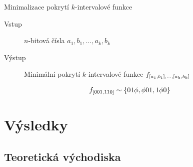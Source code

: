 \documentclass{beamer}
\theoremstyle{remark}
\begin{document}
\begin{frame}{Minimalizace pokrytí $k$-intervalové funkce}

\begin{problem} %
\begin{description}
\item[Vstup]
$n$-bitová čísla
$a_1, b_1, \ldots, a_k, b_k$

\item[Výstup]
Minimální pokrytí $k$-intervalové funkce $f_{[a_1, b_1], \ldots, [a_k, b_k]}$
\end{description}
\end{problem}

\begin{example}
$$
f_{[001, 110]} \sim \{01 \phi, \phi 01, 1 \phi 0\}
$$

\begin{figure}[h]
\centering

\end{figure}
\end{example}
\end{frame}

\section{Výsledky}

\subsection{Teoretická východiska}
\end{document}
